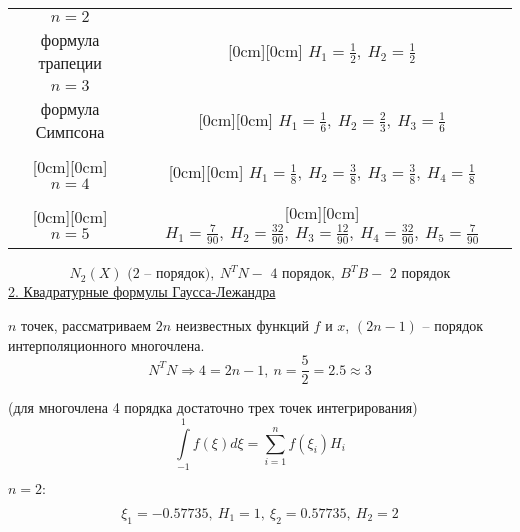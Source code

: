 \begin{center}
\begin{tabular}{|c|c|}
\hline
$n = 2$ & \\
формула трапеции & \raisebox{1.5ex}[0cm][0cm] {$H_1 = \displaystyle \frac{1}{2},\ H_2 = \frac{1}{2}$}  \\
\hline
$n=3$ & \\
формула Симпсона & \raisebox{1.5ex}[0cm][0cm] {$H_1 = \displaystyle \frac{1}{6},\ H_2 = \frac{2}{3},\ H_3 = \frac{1}{6}$}  \\
\hline
& \\
\raisebox{1.5ex}[0cm][0cm] {$n=4$} & \raisebox{1.5ex}[0cm][0cm] {$H_1 = \displaystyle \frac{1}{8},\ H_2 = \frac{3}{8},\ H_3 = \frac{3}{8},\ H_4 = \frac{1}{8}$}  \\
\hline
& \\
\raisebox{1.5ex}[0cm][0cm] {$n=5$} & \raisebox{1.5ex}[0cm][0cm] {$H_1 = \displaystyle \frac{7}{90},\ H_2 = \frac{32}{90},\ H_3 = \frac{12}{90},\ H_4 = \frac{32}{90},\ H_5 = \frac{7}{90}$}  \\
\hline
\end{tabular}
\end{center}
\[
N_2(X) \text{ (2 -- порядок)},\ N^TN - \text{ 4 порядок},\ B^T B - \text{ 2 порядок}
\]
\newpage
\underline{2. Квадратурные формулы Гаусса-Лежандра}

$n$ точек, рассматриваем $2n$ неизвестных функций $f$ и $x$, $(2n-1)$ -- порядок интерполяционного многочлена.
\[
N^T N \Rightarrow 4 = 2n - 1,\ n = \frac{5}{2} = 2.5 \approx 3
\]

(для многочлена 4 порядка достаточно трех точек интегрирования)
\[
\int \limits_{-1}^1 f(\xi) d\xi = \sum \limits_{i = 1}^n f(\xi_i) H_i
\]

$n = 2:$
\begin{center}
\end{center}
\[
\xi_1 = -0.57735,\ H_1 = 1,\ \xi_2 = 0.57735,\ H_2 = 2
\]

